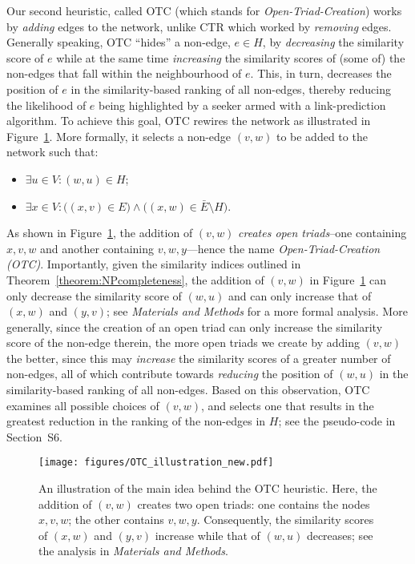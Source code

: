 \documentclass[twocolumn]{article}
\newcommand{\ER}{\bar{E}}
\newcommand{\Hide}{H}
\begin{document}
Our second heuristic, called OTC (which stands for \emph{Open-Triad-Creation}) works by \emph{adding} edges to the network, unlike CTR which worked by \emph{removing} edges. Generally speaking, OTC ``hides'' a non-edge, $e\in\Hide$, by \textit{decreasing} the similarity score of $e$ while at the same time \emph{increasing} the similarity scores of (some of) the non-edges that fall within the neighbourhood of $e$. This, in turn, decreases the position of $e$ in the similarity-based ranking of all non-edges, thereby reducing the likelihood of $e$ being highlighted by a seeker armed with a link-prediction algorithm. To achieve this goal, OTC rewires the network as illustrated in Figure~\ref{fig:OTC-illustration}. More formally, it selects a non-edge $(v,w)$ to be added to the network such that:
\begin{itemize}\itemsep-0.25em
\item $\exists u\in V\!:\!(w,u)\in \Hide$;
\item $\exists x\in V\!:\!\big((x,v)\in E\big) \wedge \big((x,w)\in\ER\setminus \Hide\big)$.
\end{itemize}
As shown in Figure~\ref{fig:OTC-illustration}, the addition of $(v,w)$ \emph{creates open triads}--one containing $x,v,w$ and another containing $v,w,y$---hence the name \textit{Open-Triad-Creation (OTC)}. Importantly, given the similarity indices outlined in Theorem~\ref{theorem:NPcompleteness}, the addition of $(v,w)$ in Figure~\ref{fig:OTC-illustration} can only decrease the similarity score of $(w,u)$ and can only increase that of $(x,w)$ and $(y,v)$; see \emph{Materials and Methods} for a more formal analysis. More generally, since the creation of an open triad can only increase the similarity score of the non-edge therein, the more open triads we create by adding $(v,w)$ the better, since this may \textit{increase} the similarity scores of a greater number of non-edges, all of which contribute towards \textit{reducing} the position of $(w,u)$ in the similarity-based ranking of all non-edges. Based on this observation, OTC examines all possible choices of $(v,w)$, and selects one that results in the greatest reduction in the ranking of the non-edges in $\Hide$; see the pseudo-code in Section~S6.

\begin{figure}[thb]
\centering
\vspace*{-0.25cm}\texttt{[image: figures/OTC\_illustration\_new.pdf]}
\caption{An illustration of the main idea behind the OTC heuristic. Here, the addition of $(v,w)$ creates two open triads: one contains the nodes $x,v,w$; the other contains $v,w,y$. Consequently, the similarity scores of $(x,w)$ and $(y,v)$ increase while that of $(w,u)$ decreases; see the analysis in \textit{Materials and Methods}.}
\label{fig:OTC-illustration}
\end{figure}
\end{document}
